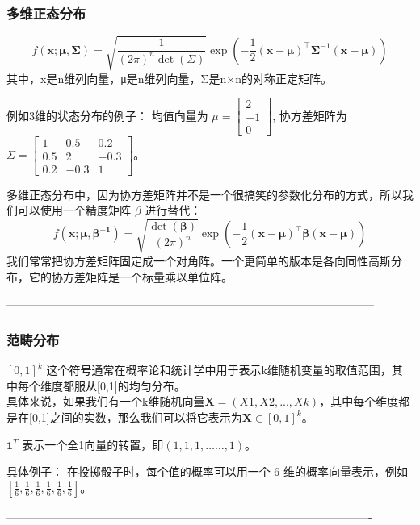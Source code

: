 \documentclass{article}
\begin{document}
\subsubsection{多维正态分布}
$$f(\boldsymbol{x};\boldsymbol{\mu},\boldsymbol{\Sigma})=\sqrt{\frac{1}{(2\pi)^n \det(\Sigma)}}\exp\left(-\frac{1}{2}(\boldsymbol{x}-\boldsymbol{\mu})^{\top}\boldsymbol{\Sigma}^{-1}(\boldsymbol{x}-\boldsymbol{\mu})\right)$$
其中，x是n维列向量，μ是n维列向量，Σ是n×n的对称正定矩阵。

例如3维的状态分布的例子：
均值向量为 $
\mu  = \begin{bmatrix}
2\\
-1\\
0
\end{bmatrix}
$,
协方差矩阵为 $
\Sigma  = \begin{bmatrix}
1 & 0.5 & 0.2 \\
0.5 & 2 & -0.3 \\
0.2 & -0.3 & 1
\end{bmatrix}
$。

多维正态分布中，因为协方差矩阵并不是一个很搞笑的参数化分布的方式，所以我们可以使用一个精度矩阵 $ \beta $ 进行替代：
$$f(\boldsymbol{x};\boldsymbol{\mu},\boldsymbol{\beta^{-1}})=\sqrt{\frac{\det(\boldsymbol{\beta})}{(2\pi)^n}}\exp\left(-\frac{1}{2}(\boldsymbol{x}-\boldsymbol{\mu})^{\top}\boldsymbol{\beta}(\boldsymbol{x}-\boldsymbol{\mu})\right)$$
我们常常把协方差矩阵固定成一个对角阵。一个更简单的版本是各向同性高斯分布，它的协方差矩阵是一个标量乘以单位阵。

--------------------------------------------------------------------------------------------------

\subsubsection{范畴分布}
$ [0,1]^k $ 这个符号通常在概率论和统计学中用于表示k维随机变量的取值范围，其中每个维度都服从[0,1]的均匀分布。 \\
具体来说，如果我们有一个k维随机向量$ \boldsymbol{X} = (X1,X2,...,Xk) $，其中每个维度都是在[0,1]之间的实数，那么我们可以将它表示为$ \boldsymbol{X} \in [0,1]^k $。

$ \boldsymbol{1}^T $ 表示一个全1向量的转置，即$ ( 1,1,1,……,1 ) $。

具体例子：
在投掷骰子时，每个值的概率可以用一个 6 维的概率向量表示，例如$ [\frac{1}{6}, \frac{1}{6}, \frac{1}{6}, \frac{1}{6}, \frac{1}{6}, \frac{1}{6}] $。

-------------------------------------------------------------------------------------------------
\end{document}
